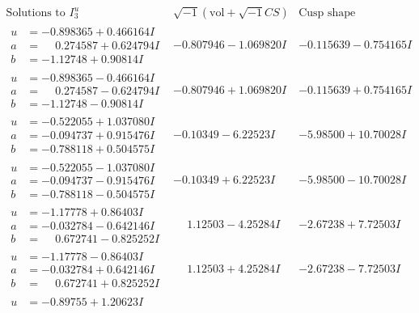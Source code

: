 \documentclass[1p]{elsarticle_modified}
\theoremstyle{definition}
\newcommand{\I}{\sqrt{-1}}
\begin{document}
$$\begin{array}{c|c|c}  
\text{Solutions to }I^u_{3}& \I (\text{vol} + \sqrt{-1}CS) & \text{Cusp shape}\\
 \hline 
\begin{aligned}
u &= -0.898365 + 0.466164 I \\
a &= \phantom{-}0.274587 + 0.624794 I \\
b &= -1.12748 + 0.90814 I\end{aligned}
 & -0.807946 - 1.069820 I & -0.115639 - 0.754165 I \\ \hline\begin{aligned}
u &= -0.898365 - 0.466164 I \\
a &= \phantom{-}0.274587 - 0.624794 I \\
b &= -1.12748 - 0.90814 I\end{aligned}
 & -0.807946 + 1.069820 I & -0.115639 + 0.754165 I \\ \hline\begin{aligned}
u &= -0.522055 + 1.037080 I \\
a &= -0.094737 + 0.915476 I \\
b &= -0.788118 + 0.504575 I\end{aligned}
 & -0.10349 - 6.22523 I & -5.98500 + 10.70028 I \\ \hline\begin{aligned}
u &= -0.522055 - 1.037080 I \\
a &= -0.094737 - 0.915476 I \\
b &= -0.788118 - 0.504575 I\end{aligned}
 & -0.10349 + 6.22523 I & -5.98500 - 10.70028 I \\ \hline\begin{aligned}
u &= -1.17778 + 0.86403 I \\
a &= -0.032784 - 0.642146 I \\
b &= \phantom{-}0.672741 - 0.825252 I\end{aligned}
 & \phantom{-}1.12503 - 4.25284 I & -2.67238 + 7.72503 I \\ \hline\begin{aligned}
u &= -1.17778 - 0.86403 I \\
a &= -0.032784 + 0.642146 I \\
b &= \phantom{-}0.672741 + 0.825252 I\end{aligned}
 & \phantom{-}1.12503 + 4.25284 I & -2.67238 - 7.72503 I \\ \hline\begin{aligned}
u &= -0.89755 + 1.20623 I \\

\end{aligned}
\end{array}$$
\end{document}

